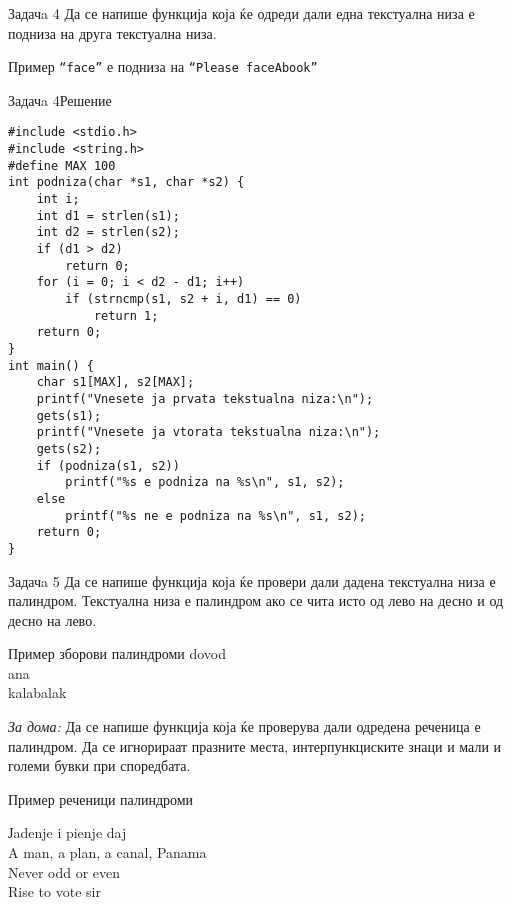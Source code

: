 \begin{frame}{Задачa 4}
Да се напише функција која ќе одреди дали една текстуална низа е подниза на
друга текстуална низа.
\begin{exampleblock}{Пример}
\texttt{``face''} е подниза на \texttt{``Please faceAbook''}
\end{exampleblock}  
\end{frame}

\begin{frame}[fragile]{Задачa 4}{Решение}
\begin{lstlisting}
#include <stdio.h>
#include <string.h>
#define MAX 100
int podniza(char *s1, char *s2) {
    int i;
    int d1 = strlen(s1);
    int d2 = strlen(s2);
    if (d1 > d2)
        return 0;
    for (i = 0; i < d2 - d1; i++)
        if (strncmp(s1, s2 + i, d1) == 0)
            return 1;
    return 0;
}
int main() {
    char s1[MAX], s2[MAX];
    printf("Vnesete ja prvata tekstualna niza:\n");
    gets(s1);
    printf("Vnesete ja vtorata tekstualna niza:\n");
    gets(s2);
    if (podniza(s1, s2))
        printf("%s e podniza na %s\n", s1, s2);
    else
        printf("%s ne e podniza na %s\n", s1, s2);
    return 0;
}
\end{lstlisting}
\end{frame}

\begin{frame}{Задачa 5}
Да се напише функција која ќе провери дали дадена текстуална низа е палиндром.
Текстуална низа е палиндром ако се чита исто од лево на десно и од десно на
лево.
\begin{exampleblock}{Пример зборови палиндроми}
dovod\\
ana\\
kalabalak
\end{exampleblock}
\begin{scriptsize}
\emph{За дома:} Да се напише функција која ќе проверува дали одредена реченица е
палиндром. Да се игнорираат празните места, интерпункциските знаци и мали и
големи бувки при споредбата.
\end{scriptsize}
\begin{exampleblock}{Пример реченици палиндроми}
\begin{scriptsize}
Јadenje i pienje daj\\
A man, a plan, a canal, Panama\\
Never odd or even\\
Rise to vote sir
\end{scriptsize}
\end{exampleblock}

\end{frame}

